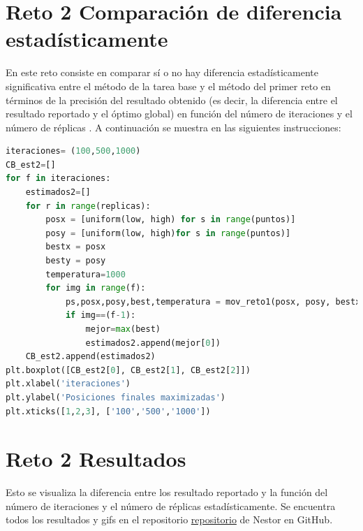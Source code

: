 \documentclass{article}
\begin{document}
\newpage

\section{Reto 2 Comparación de diferencia estadísticamente}\label{}
En este reto consiste en comparar sí o no hay diferencia estadísticamente significativa entre el método de la tarea base y el método del primer reto en términos de la precisión del resultado obtenido (es decir, la diferencia entre el resultado reportado y el óptimo global) en función del número de iteraciones y el número de réplicas \cite{elisa1}. A continuación se muestra en las siguientes instrucciones: 

\begin{lstlisting}[caption=Comparación de iteraciones, language=Python]
iteraciones= (100,500,1000)
CB_est2=[]
for f in iteraciones:
    estimados2=[]
    for r in range(replicas):
        posx = [uniform(low, high) for s in range(puntos)]
        posy = [uniform(low, high)for s in range(puntos)]
        bestx = posx
        besty = posy
        temperatura=1000
        for img in range(f):
            ps,posx,posy,best,temperatura = mov_reto1(posx, posy, bestx,besty, temperatura)
            if img==(f-1):
                mejor=max(best)
                estimados2.append(mejor[0])
    CB_est2.append(estimados2)
plt.boxplot([CB_est2[0], CB_est2[1], CB_est2[2]])
plt.xlabel('iteraciones')
plt.ylabel('Posiciones finales maximizadas')
plt.xticks([1,2,3], ['100','500','1000'])
\end{lstlisting}

\section{Reto 2 Resultados}\label{}
Esto se visualiza la diferencia entre los resultado reportado y la función del número de iteraciones y el número de réplicas estadísticamente. Se encuentra todos los resultados y gifs en el repositorio \href{https://github.com/satuelisa/Simulation/blob/master/LocalSearch/minimize1D.py}{repositorio} de Nestor en GitHub.\\
\end{document}
